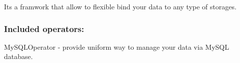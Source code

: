 It\textquotesingle{}s a framwork that allow to flexible bind your data to any type of storages.

\subsubsection*{Included operators\+:}


\begin{DoxyItemize}
\item My\+S\+Q\+L\+Operator -\/ provide uniform way to manage your data via My\+S\+QL database. 
\end{DoxyItemize}